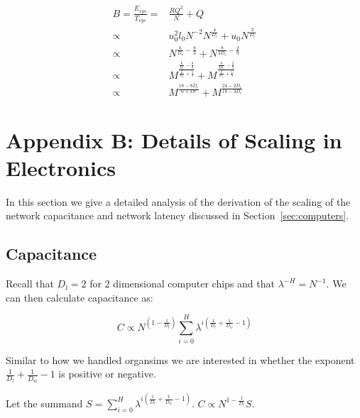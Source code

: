 \documentclass[12pt]{article}
\begin{document}
\begin{align*}
B = \frac{E_{sys}}{T_{sys}} =& \frac{RQ^2}{N} + Q \\
 \propto & u_0^2 l_0 N^{-2} N^{\frac{4}{D_r}} + u_0 N^{\frac{2}{D_r}} \\
 \propto & N^{\frac{6}{D_r}- \frac{8}{3}} + N^{\frac{8}{3 D_r} - \frac{2}{9}} \\
 \propto & M^{\frac{\frac{6}{D_r} - \frac{8}{3}}{\frac{2}{D_r} + \frac{1}{3}}}
 + M^{\frac{\frac{8}{3D_r} - \frac{2}{9}}{\frac{2}{D_r} + \frac{1}{3}} } \\
 \propto & M^{\frac{18-8D_r}{6+Dr}} + M^{\frac{24-2D_r}{18-3D_r}} 
\end{align*}

\newpage

\section{Appendix B: Details of Scaling in Electronics}
\label{sec:AppendixChips}

In this section we give a detailed analysis of the derivation of the scaling of
the network capacitance and network latency discussed in
Section~\ref{sec:computers}.

\subsection{Capacitance}

Recall that $D_l = 2$ for $2$ dimensional computer
chips and that $\lambda^{-H}=N^{-1}$. We can then calculate capacitance as:

\begin{equation}
  C \propto  N^{(1- \frac{1}{D_l})} \sum_{i=0}^H \lambda^{i \left( 
\frac{1}{D_l} + \frac{1}{D_w} -1 \right)}
\end{equation}

Similar to how we handled organsims we are interested in whether the exponent
$\frac{1}{D_l} + \frac{1}{D_w} -1$ is positive or negative.

Let the summand $S = \sum_{i=0}^H \lambda^{i(\frac{1}{D_l} +
\frac{1}{D_w}-1)}$. $C \propto
N^{1-\frac{1}{D_l}} S$. 
\end{document}
